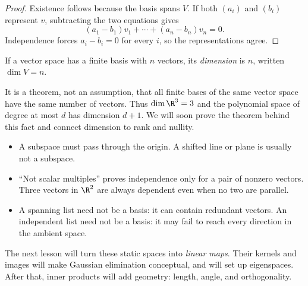 \begin{proof}
Existence follows because the basis spans $V$. If both $(a_i)$ and $(b_i)$ represent $v$, subtracting the two equations gives
\[
  (a_1-b_1)v_1+\cdots+(a_n-b_n)v_n=0.
\]
Independence forces $a_i-b_i=0$ for every $i$, so the representations agree.
\end{proof}

\begin{definition}[Dimension]
If a vector space has a finite basis with $n$ vectors, its \emph{dimension} is $n$, written $\dim V=n$.
\end{definition}

It is a theorem, not an assumption, that all finite bases of the same vector space have the same number of vectors. Thus $\dim\R^3=3$ and the polynomial space of degree at most $d$ has dimension $d+1$. We will soon prove the theorem behind this fact and connect dimension to rank and nullity.

\begin{remark}
\begin{itemize}
  \item A subspace must pass through the origin. A shifted line or plane is usually not a subspace.
  \item ``Not scalar multiples'' proves independence only for a pair of nonzero vectors. Three vectors in $\R^2$ are always dependent even when no two are parallel.
  \item A spanning list need not be a basis: it can contain redundant vectors. An independent list need not be a basis: it may fail to reach every direction in the ambient space.
\end{itemize}
\end{remark}

The next lesson will turn these static spaces into \emph{linear maps}. Their kernels and images will make Gaussian elimination conceptual, and will set up eigenspaces. After that, inner products will add geometry: length, angle, and orthogonality.
